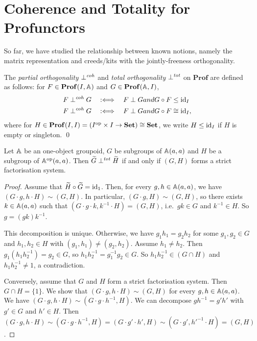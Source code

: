 \section{Coherence and Totality for Profunctors}
So far, we have studied the relationship between known notions, namely the matrix representation and creeds/kits with the jointly-freeness orthogonality.

\newcommand{\ProfCat}{\mathbf{Prof}}
\newcommand{\CohProf}{\mathbf{CohProf}}
\newcommand{\TotProf}{\mathbf{TotProf}}
\begin{definition}
    The \emph{partial orthogonality} \( \mathrel{\bot}^{\mathit{coh}} \) and \emph{total orthogonality} \( \mathrel{\bot}^{\mathit{tot}} \) on \( \ProfCat \) are defined as follows:
    for \( F \in \ProfCat(I, \Grp) \) and \( G \in \ProfCat(\Grp, I) \),
    \begin{align*}
        F \mathrel{\bot}^{\mathit{coh}} G &\quad:\Longleftrightarrow\quad F \mathrel{\bot} G \relax{ and } G \circ F \le \mathrm{id}_I \\ 
        F \mathrel{\bot}^{\mathit{coh}} G &\quad:\Longleftrightarrow\quad F \mathrel{\bot} G \relax{ and } G \circ F \cong \mathrm{id}_I,
    \end{align*}
    where for \( H \in \ProfCat(I,I) = (I^\op \times I \to \Set) \cong \Set \), we write \( H \le \mathrm{id}_I \) if \( H \) is empty or singleton.
    \qed
\end{definition}

\begin{proposition}
    Let \( \mathbb{A} \) be an one-object groupoid, \( G \) be subgroups of \( \mathbb{A}(a,a) \) and \( H \) be a subgroup of \( \mathbb{A}^{\mathrm{op}}(a,a) \).
    Then \( \widetilde{G} \mathrel{\bot}^{\mathit{tot}} \widetilde{H} \) if and only if \( (G, H) \) forms a strict factorisation system.
\end{proposition}
\begin{proof}
    Assume that \( \widetilde{H} \circ \widetilde{G} = \mathrm{id}_1 \).
    Then, for every \( g, h \in \mathbb{A}(a,a) \), we have \( (G \cdot g, h \cdot H) \sim (G, H) \).
    In particular, \( (G \cdot g, H) \sim (G, H) \), so there exists \( k \in \mathbb{A}(a,a) \) such that \( (G \cdot g \cdot k, k^{-1} \cdot H) = (G, H) \), i.e.~\( gk \in G \) and \( k^{-1} \in H \).
    So \( g = (gk) k^{-1} \).

    This decomposition is unique.
    Otherwise, we have \( g_1 h_1 = g_2 h_2 \) for some \( g_1, g_2 \in G \) and \( h_1, h_2 \in H \) with \( (g_1, h_1) \neq (g_2, h_2) \).
    Assume \( h_1 \neq h_2 \).
    Then \( g_1 (h_1 h_2^{-1}) = g_2 \in G \), so \( h_1 h_2^{-1} = g_1^{-1} g_2 \in G \).
    So \( h_1 h_2^{-1} \in (G \cap H) \) and \( h_1 h_2^{-1} \neq 1 \), a contradiction.

    Conversely, assume that \( G \) and \( H \) form a strict factorisation system.
    Then \( G \cap H = \{ 1 \} \).
    We show that \( (G \cdot g, h \cdot H) \sim (G, H) \) for every \( g, h \in \mathbb{A}(a,a) \).
    We have \( (G \cdot g, h \cdot H) \sim (G \cdot g \cdot h^{-1}, H) \).
    We can decompose \( g h^{-1} = g' h' \) with \( g' \in G \) and \( h' \in H \).
    Then \( (G \cdot g, h \cdot H) \sim (G \cdot g \cdot h^{-1}, H) = (G \cdot g' \cdot h', H) \sim (G \cdot g', h'^{-1} \cdot H) = (G, H) \).
\end{proof}

